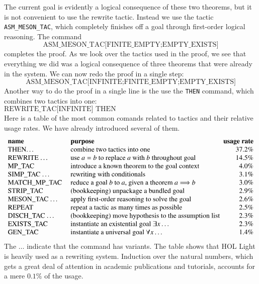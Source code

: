 \documentclass{llncs}
\begin{document}
The current goal is evidently a logical consequence of these two theorems, but it is not convenient to use the rewrite tactic.  Instead we use the tactic {\tt ASM\_MESON\_TAC},
which completely finishes off a goal through first-order logical reasoning.  The command
\[
\text{ASM\_MESON\_TAC[FINITE\_EMPTY;EMPTY\_EXISTS]}
\]
completes the proof.  As we look over the tactics used in the proof,
we see that everything we did was a logical consequence of three
theorems that were already in the system.  We can now redo the proof
in a single step:
\[
\text{ASM\_MESON\_TAC[INFINITE;FINITE\_EMPTY;EMPTY\_EXISTS]}
\]
Another way to do the proof in a single line is the use the {\tt THEN} command,
which combines two tactics into one:
\[
\text{REWRITE\_TAC[INFINITE] THEN ASM\_MESON\_TAC[FINITE\_EMPTY;EMPTY\_EXISTS]}
\]
Here is a table of the most common comands related to tactics and their relative 
usage rates.  We have already introduced several of them.
\[
\begin{array}{llr}
\text{\bf name}  &~\text{\bf purpose} &\text{\bf usage rate}\\
\text{THEN\dots }   &~\text{combine two tactics into one}   & 37.2\%\\
\text{REWRITE \dots} &~\text{use $a=b$ to replace $a$ with $b$ throughout goal} & 14.5\%\\
\text{MP\_TAC} &~\text{introduce a known theorem to the goal context} &4.0\%\\
\text{SIMP\_TAC \dots}&~\text{rewriting with conditionals} & 3.1\%\\
\text{MATCH\_MP\_TAC} &~\text{reduce a goal $b$ to $a$, given a theorem $a\Longrightarrow b$}& 3.0\%\\
\text{STRIP\_TAC} &~\text{(bookkeeping) unpackage a bundled goal} & 2.9\%\\
\text{MESON\_TAC \dots}&~\text{apply first-order reasoning to solve the goal} & 2.6\%\\
\text{REPEAT} &~\text{repeat a tactic as many times as possible} & 2.5\%\\
\text{DISCH\_TAC \dots}&~\text{(bookkeeping) move hypothesis to the assumption list\!\!\!} & 2.3\%\\
\text{EXISTS\_TAC}&~\text{instantiate an existential goal $\exists x\dots$}& 2.3\%\\
\text{GEN\_TAC}&~\text{instantiate a universal goal $\forall x\dots$}& 1.4\%
\end{array}
\]
The $\dots$ indicate that the command has variants.  The table shows
that HOL Light is heavily used as a rewriting system.  Induction over
the natural numbers, which gets a great deal of attention in academic
publications and tutorials, accounts for a mere $0.1\%$ of the usage.
\end{document}

